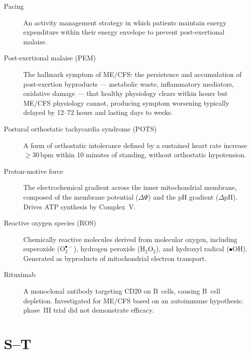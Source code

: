 \begin{description}
\item[Pacing] An activity management strategy in which patients maintain energy expenditure within their energy envelope to prevent post-exertional malaise.
\item[Post-exertional malaise (PEM)] The hallmark symptom of ME/CFS: the persistence and accumulation of post-exertion byproducts --- metabolic waste, inflammatory mediators, oxidative damage --- that healthy physiology clears within hours but ME/CFS physiology cannot, producing symptom worsening typically delayed by 12--72 hours and lasting days to weeks.
\item[Postural orthostatic tachycardia syndrome (POTS)] A form of orthostatic intolerance defined by a sustained heart rate increase $\geq 30$\,bpm within 10 minutes of standing, without orthostatic hypotension.
\item[Proton-motive force] The electrochemical gradient across the inner mitochondrial membrane, composed of the membrane potential ($\Delta\Psi$) and the pH gradient ($\Delta$pH). Drives ATP synthesis by Complex~V.
\item[Reactive oxygen species (ROS)] Chemically reactive molecules derived from molecular oxygen, including superoxide ($\text{O}_2^{\bullet-}$), hydrogen peroxide (H$_2$O$_2$), and hydroxyl radical ($\bullet$OH). Generated as byproducts of mitochondrial electron transport.
\item[Rituximab] A monoclonal antibody targeting CD20 on B~cells, causing B~cell depletion. Investigated for ME/CFS based on an autoimmune hypothesis; phase~III trial did not demonstrate efficacy.
\end{description}

\section*{S--T}

